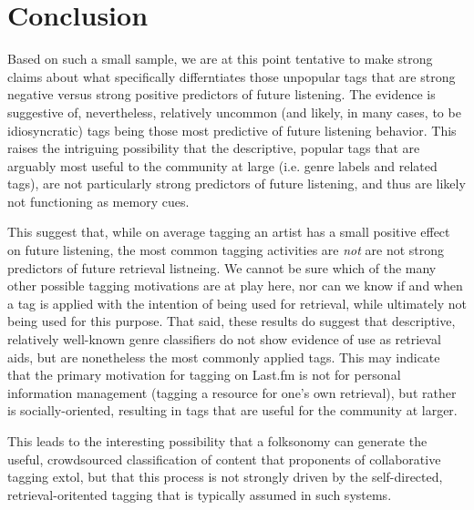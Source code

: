 \section{Conclusion}
\label{sec_conclusion}

Based on such a small sample, we are at this point tentative to make strong claims about what specifically differntiates those unpopular tags that are strong negative versus strong positive predictors of future listening. The evidence is suggestive of, nevertheless, relatively uncommon (and likely, in many cases, to be idiosyncratic) tags being those most predictive of future listening behavior. This raises the intriguing possibility that the descriptive, popular tags that are arguably most useful to the community at large (i.e. genre labels and related tags), are not particularly strong predictors of future listening, and thus are likely not functioning as memory cues. 

This suggest that, while on average tagging an artist  has a small positive effect on future listening, the most common tagging activities are \emph{not} are not strong predictors of future retrieval listneing. We cannot be sure which of the many other possible tagging motivations are at play here, nor can we know if and when a tag is applied with the intention of being used for retrieval, while ultimately not being used for this purpose. That said, these results do suggest that descriptive, relatively well-known genre classifiers do not show evidence of use as retrieval aids, but are nonetheless the most commonly applied tags. This may indicate that the primary motivation for tagging on Last.fm is not for personal information management (tagging a resource for one's own retrieval), but rather is socially-oriented, resulting in tags that are useful for the community at larger.

This leads to the interesting possibility that a folksonomy can generate the useful, crowdsourced classification of content that proponents of collaborative tagging extol, but that this process is not strongly driven by the self-directed, retrieval-oritented tagging that is typically assumed in such systems.

